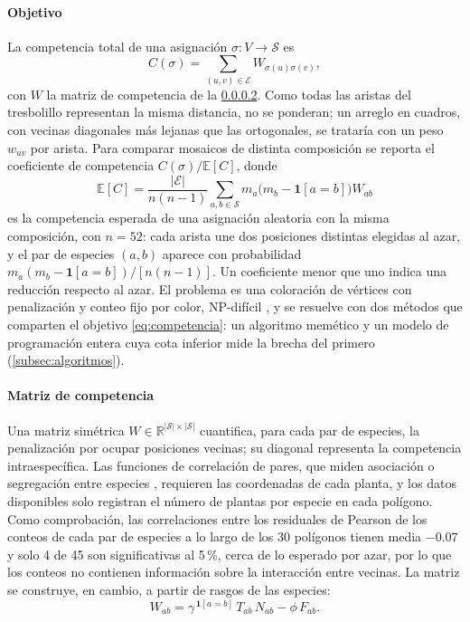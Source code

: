 \paragraph{Objetivo} La competencia total de una asignación $\sigma:V\to\mathcal{S}$ es
\begin{equation}
  C(\sigma)=\sum_{(u,v)\in\mathcal{E}}W_{\sigma(u)\sigma(v)},
  \label{eq:competencia}
\end{equation}
con $W$ la matriz de competencia de la \cref{subsec:espacial-matriz}. Como todas las aristas del tresbolillo representan la misma distancia, no se ponderan; un arreglo en cuadros, con vecinas diagonales más lejanas que las ortogonales, se trataría con un peso $w_{uv}$ por arista. Para comparar mosaicos de distinta composición se reporta el coeficiente de competencia $C(\sigma)/\mathbb{E}[C]$, donde
\begin{equation}
  \mathbb{E}[C]=\frac{|\mathcal{E}|}{n(n-1)}\sum_{a,b\in\mathcal{S}}m_a\bigl(m_b-\mathbf{1}[a=b]\bigr)W_{ab}
  \label{eq:competencia-azar}
\end{equation}
es la competencia esperada de una asignación aleatoria con la misma composición, con $n=52$: cada arista une dos posiciones distintas elegidas al azar, y el par de especies $(a,b)$ aparece con probabilidad $m_a(m_b-\mathbf{1}[a=b])/[n(n-1)]$. Un coeficiente menor que uno indica una reducción respecto al azar. El problema es una coloración de vértices con penalización y conteo fijo por color, NP-difícil \autocite{eisenblatter2002}, y se resuelve con dos métodos que comparten el objetivo \eqref{eq:competencia}: un algoritmo memético y un modelo de programación entera cuya cota inferior mide la brecha del primero (\cref{subsec:algoritmos}).

\paragraph{Matriz de competencia}
\label{subsec:espacial-matriz}

Una matriz simétrica $W\in\mathbb{R}^{|\mathcal{S}|\times|\mathcal{S}|}$ cuantifica, para cada par de especies, la penalización por ocupar posiciones vecinas; su diagonal representa la competencia intraespecífica. Las funciones de correlación de pares, que miden asociación o segregación entre especies \autocite{wiegand2014}, requieren las coordenadas de cada planta, y los datos disponibles solo registran el número de plantas por especie en cada polígono. Como comprobación, las correlaciones entre los residuales de Pearson de los conteos de cada par de especies a lo largo de los 30 polígonos tienen media $-0.07$ y solo 4 de 45 son significativas al 5\,\%, cerca de lo esperado por azar, por lo que los conteos no contienen información sobre la interacción entre vecinas. La matriz se construye, en cambio, a partir de rasgos de las especies:
\begin{equation}
W_{ab}=\gamma^{\,\mathbf{1}[a=b]}\,T_{ab}\,N_{ab}-\phi\,F_{ab}.
\label{eq:matriz-W}
\end{equation}


